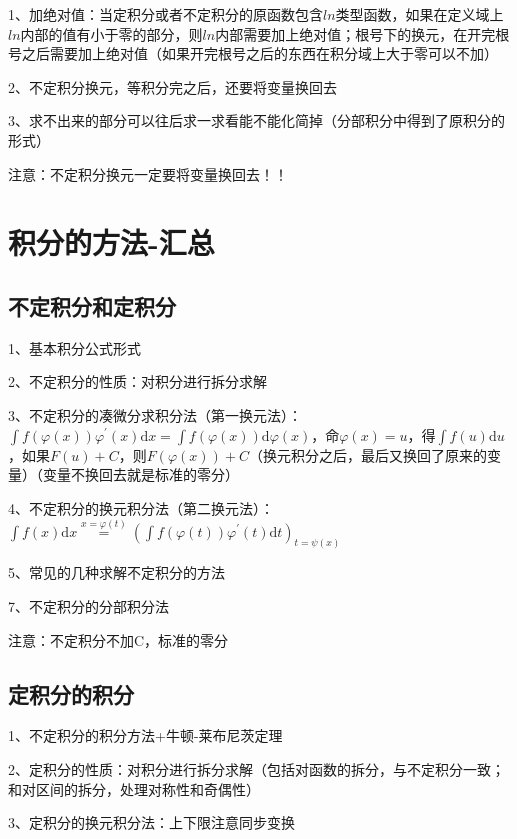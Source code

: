 1、加绝对值：当定积分或者不定积分的原函数包含$ln$类型函数，如果在定义域上$ln$内部的值有小于零的部分，则$ln$内部需要加上绝对值；根号下的换元，在开完根号之后需要加上绝对值（如果开完根号之后的东西在积分域上大于零可以不加）

2、不定积分换元，等积分完之后，还要将变量换回去

3、求不出来的部分可以往后求一求看能不能化简掉（分部积分中得到了原积分的形式）

注意：不定积分换元一定要将变量换回去！！

\section{积分的方法-汇总}



\subsection{不定积分和定积分}

1、基本积分公式形式

2、不定积分的性质：对积分进行拆分求解

3、不定积分的凑微分求积分法（第一换元法）：$\int f(\varphi(x)) \varphi^{\prime}(x) \mathrm{d} x =\int f(\varphi(x)) \mathrm{d} \varphi(x) $，命$\varphi(x)=u$，得$\int f(u) \mathrm{d} u $，如果$F(u)+C $，则$F(\varphi(x))+C$（换元积分之后，最后又换回了原来的变量）（变量不换回去就是标准的零分）

4、不定积分的换元积分法（第二换元法）：$\int f(x) \mathrm{d} x \stackrel{x=\varphi(t)}{=}\left(\int f(\varphi(t)) \varphi^{\prime}(t) \mathrm{d} t\right)_{t=\psi(x)}$

5、常见的几种求解不定积分的方法

7、不定积分的分部积分法

注意：不定积分不加C，标准的零分



\subsection{定积分的积分}

1、不定积分的积分方法+牛顿-莱布尼茨定理

2、定积分的性质：对积分进行拆分求解（包括对函数的拆分，与不定积分一致；和对区间的拆分，处理对称性和奇偶性）

3、定积分的换元积分法：上下限注意同步变换

